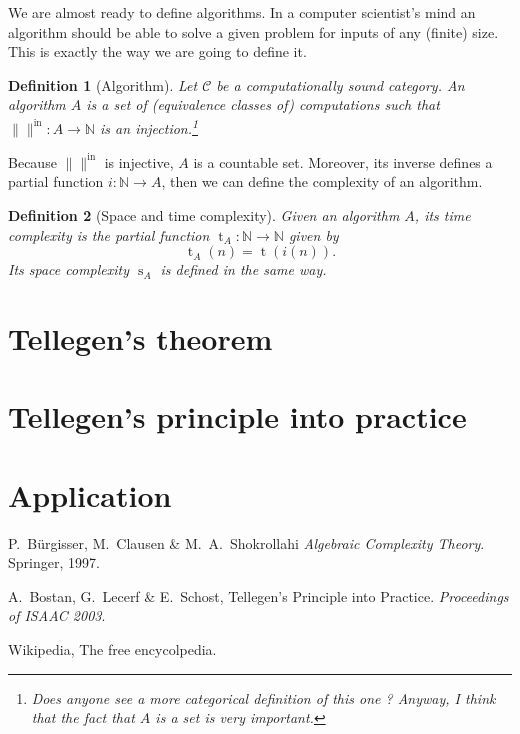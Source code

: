 \documentclass{article}
\newcommand{\cat}[1]{\mathscr{#1}}
\newcommand{\C}{\cat{C}}
\newcommand{\size}[1]{\lVert#1\rVert}
\newcommand{\sizein}[1]{\size{#1}^\mathrm{in}}
\newcommand{\N}{\mathbb{N}}
\newcommand{\ra}{\rightarrow}
\DeclareMathOperator{\Time}{t}
\DeclareMathOperator{\Space}{s}
\newtheorem{definition}{Definition}
\begin{document}
  We are almost ready to define algorithms. In a computer scientist's
  mind an algorithm should be able to solve a given problem for inputs
  of any (finite) size. This is exactly the way we are going to define
  it.

  \begin{definition}[Algorithm]
    Let $\C$ be a computationally sound category. An algorithm $A$ is
    a set of (equivalence classes of) computations such that
    ${\sizein{}:A\ra\N}$ is an injection.\footnote{Does anyone see a
    more categorical definition of this one ? Anyway, I think that the
    fact that $A$ is a set is very important.}
  \end{definition}

  Because $\sizein{}$ is injective, $A$ is a countable set. Moreover,
  its inverse defines a partial function $i:\N\ra A$, then we can
  define the complexity of an algorithm.
  
  \begin{definition}[Space and time complexity]
    Given an algorithm $A$, its time complexity is the partial
    function ${\Time_A : \N \ra \N}$ given by
    \[\Time_A(n) = \Time(i(n)) \text{.}\]
    Its space complexity $\Space_A$ is defined in the same way.
  \end{definition}



  \section{Tellegen's theorem}
  
  \section{Tellegen's principle into practice}
  
  \section{Application}


  
  \begin{thebibliography}{1}
    
  P.~Bürgisser, M.~Clausen \& M.~A.~Shokrollahi
    \emph{Algebraic Complexity Theory}.
    Springer, 1997.
    
  A.~Bostan, G.~Lecerf \& E.~Schost,
    Tellegen's Principle into Practice.
    \emph{Proceedings of ISAAC 2003}.

  Wikipedia, The free encycolpedia.
  
  \end{thebibliography}
\end{document}
